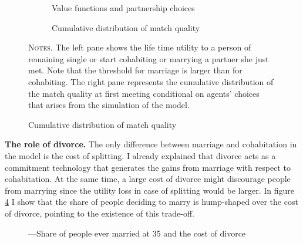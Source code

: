 \documentclass[12pt]{article}
\begin{document}
\begin{figure}[h!]
\caption{}
\label{fig:match_q}

\begin{subfigure}{.49\textwidth}
\centering
\vspace{0.16em}
\vspace{0.0em}
\caption{Value functions and partnership choices}
\label{fig:sub-firs1tq}
\scalebox{0.5}{ } 
\end{subfigure}
\begin{subfigure}{.49\textwidth}
\centering
\caption{Cumulative distribution of match quality}
\label{fig:sub-second1q}
\scalebox{0.5}{ } 
\end{subfigure}
\begin{minipage}{0.99\textwidth} %

\hspace{50em}

{\footnotesize \textsc{Notes.} The left pane shows the life time utility to a person of remaining single or start cohabiting or marrying a partner she just met. Note that the threshold for marriage is larger than for cohabiting. The right pane represents the cumulative distribution of the match quality at first meeting conditional on agents' choices that arises from the simulation of the model. \par}
\end{minipage}
\end{figure}

\textbf{The role of divorce.}  The only difference between marriage and cohabitation in the model is the cost of splitting. I already explained that divorce acts as a commitment technology that generates the gains from marriage with respect to cohabitation. At the same time, a large cost of divorce might discourage people from marrying since the utility loss in case of splitting would be larger. In figure \ref{fig:divor} I show that the share of people deciding to marry is hump-shaped over the cost of divorce, pointing to the existence of this trade-off.
\begin{figure}[h!]
	\centering
	\caption{---Share of people ever married at 35 and the cost of divorce} 
	\label{fig:divor}
	\hspace*{-1.5cm} 
	\resizebox{0.9\textwidth}{!}{}
\end{figure}
\end{document}
